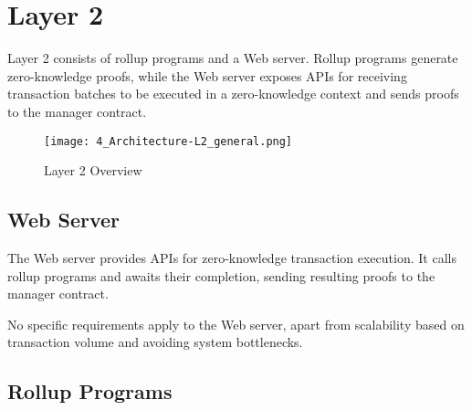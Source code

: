 \section{Layer 2\label{sec:designlayer2}}
Layer 2 consists of rollup programs and a Web server. Rollup programs generate zero-knowledge proofs, while the Web server exposes APIs for receiving transaction batches to be executed in a zero-knowledge context and sends proofs to the manager contract.

\begin{figure}[htb]
  \centering
  \texttt{[image: 4\_Architecture-L2\_general.png]}
  \caption{Layer 2 Overview}
  \label{fig:layer2overview}
\end{figure}

\subsection{Web Server\label{sec:designwebserver}}
The Web server provides APIs for zero-knowledge transaction execution. It calls rollup programs and awaits their completion, sending resulting proofs to the manager contract.

No specific requirements apply to the Web server, apart from scalability based on transaction volume and avoiding system bottlenecks.

\subsection{Rollup Programs\label{sec:designrollupprograms}}
